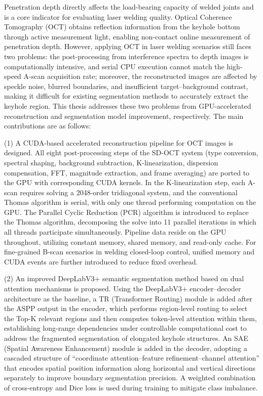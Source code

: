 \begin{abstractEN}
\setlength{\baselineskip}{23pt} %

Penetration depth directly affects the load-bearing capacity of welded joints and is a core indicator for evaluating laser welding quality. Optical Coherence Tomography (OCT) obtains reflection information from the keyhole bottom through active measurement light, enabling non-contact online measurement of penetration depth. However, applying OCT in laser welding scenarios still faces two problems: the post-processing from interference spectra to depth images is computationally intensive, and serial CPU execution cannot match the high-speed A-scan acquisition rate; moreover, the reconstructed images are affected by speckle noise, blurred boundaries, and insufficient target--background contrast, making it difficult for existing segmentation methods to accurately extract the keyhole region. This thesis addresses these two problems from GPU-accelerated reconstruction and segmentation model improvement, respectively. The main contributions are as follows:

(1) A CUDA-based accelerated reconstruction pipeline for OCT images is designed. All eight post-processing steps of the SD-OCT system (type conversion, spectral shaping, background subtraction, K-linearization, dispersion compensation, FFT, magnitude extraction, and frame averaging) are ported to the GPU with corresponding CUDA kernels. In the K-linearization step, each A-scan requires solving a 2048-order tridiagonal system, and the conventional Thomas algorithm is serial, with only one thread performing computation on the GPU. The Parallel Cyclic Reduction (PCR) algorithm is introduced to replace the Thomas algorithm, decomposing the solve into 11 parallel iterations in which all threads participate simultaneously. Pipeline data reside on the GPU throughout, utilizing constant memory, shared memory, and read-only cache. For fine-grained B-scan scenarios in welding closed-loop control, unified memory and CUDA events are further introduced to reduce fixed overhead.

(2) An improved DeepLabV3+ semantic segmentation method based on dual attention mechanisms is proposed. Using the DeepLabV3+ encoder--decoder architecture as the baseline, a TR (Transformer Routing) module is added after the ASPP output in the encoder, which performs region-level routing to select the Top-K relevant regions and then computes token-level attention within them, establishing long-range dependencies under controllable computational cost to address the fragmented segmentation of elongated keyhole structures. An SAE (Spatial Awareness Enhancement) module is added in the decoder, adopting a cascaded structure of ``coordinate attention--feature refinement--channel attention'' that encodes spatial position information along horizontal and vertical directions separately to improve boundary segmentation precision. A weighted combination of cross-entropy and Dice loss is used during training to mitigate class imbalance.


\end{abstractEN}
